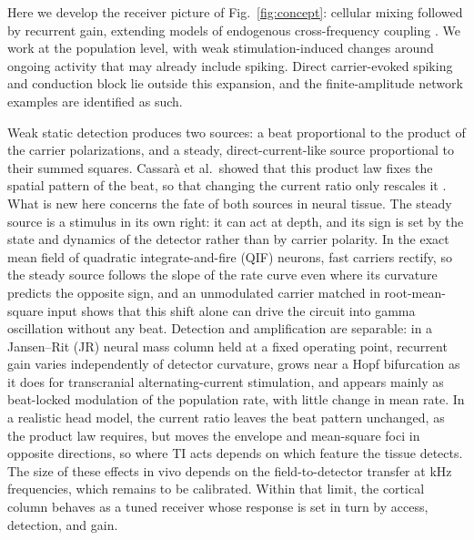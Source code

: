 
Here we develop the receiver picture of Fig.~\ref{fig:concept}: cellular mixing followed
by recurrent gain, extending models of endogenous cross-frequency coupling
\cite{ruffini2025cfc,ruffini2025ham}. We work at the population level, with weak
stimulation-induced changes around ongoing activity that may already include spiking.
Direct carrier-evoked spiking and conduction block
\cite{opancar2025,peripheral2023,semenov2025} lie outside this expansion, and the
finite-amplitude network examples are identified as such.

Weak static detection produces two sources: a beat proportional to the product of the
carrier polarizations, and a steady, direct-current-like source proportional to their
summed squares. Cassar\`a et al.\ showed that this product law fixes the spatial
pattern of the beat, so that changing the current ratio only rescales it
\cite{cassara2025part2}. What is new here concerns the fate of both sources in neural
tissue. The steady source is a stimulus in its own right: it can act at depth, and its
sign is set by the state and dynamics of the detector rather than by carrier polarity.
In the exact mean field of quadratic integrate-and-fire (QIF) neurons, fast carriers
rectify, so the steady source follows the slope of the rate curve even where its
curvature predicts the opposite sign, and an unmodulated carrier matched in
root-mean-square input shows that this shift alone can drive the circuit into gamma
oscillation without any beat. Detection and amplification are separable: in a
Jansen--Rit (JR) neural mass column held at a fixed operating point, recurrent gain
varies independently of detector curvature, grows near a Hopf bifurcation as it does for
transcranial alternating-current stimulation, and appears mainly as beat-locked
modulation of the population rate, with little change in mean rate. In a realistic head
model, the current ratio leaves the beat pattern unchanged, as the product law requires,
but moves the envelope and mean-square foci in opposite directions, so where TI acts
depends on which feature the tissue detects. The size of these effects in vivo depends
on the field-to-detector transfer at kHz frequencies, which remains to be calibrated.
Within that limit, the cortical column behaves as a tuned receiver whose response is set
in turn by access, detection, and gain.
